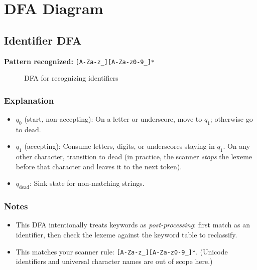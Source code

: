\documentclass[12pt,a4paper]{article}
\begin{document}
\section{DFA Diagram}

\subsection*{Identifier DFA}
\noindent\textbf{Pattern recognized:} \texttt{[A-Za-z\_][A-Za-z0-9\_]*}

\begin{figure}[h]
\centering
{}
\caption{DFA for recognizing identifiers}
\end{figure}

\subsubsection*{Explanation}
\begin{itemize}
  \item $q_0$ (start, non-accepting): On a letter or underscore, move to $q_1$; otherwise go to dead.
  \item $q_1$ (accepting): Consume letters, digits, or underscores staying in $q_1$. On any other character, transition to dead (in practice, the scanner \emph{stops} the lexeme before that character and leaves it to the next token).
  \item $q_{\text{dead}}$: Sink state for non-matching strings.
\end{itemize}

\subsubsection*{Notes}
\begin{itemize}
  \item This DFA intentionally treats keywords as \emph{post-processing}: first match as an identifier, then check the lexeme against the keyword table to reclassify.
  \item This matches your scanner rule: \texttt{[A-Za-z\_][A-Za-z0-9\_]*}. (Unicode identifiers and universal character names are out of scope here.)
\end{itemize}
\end{document}
